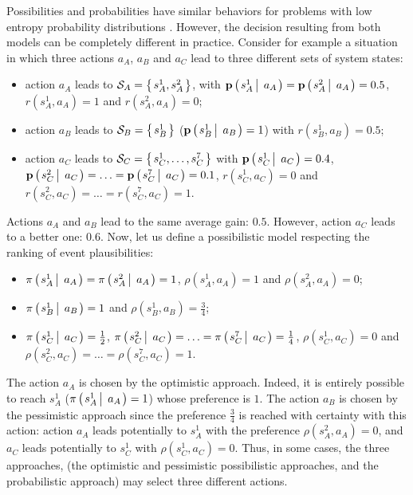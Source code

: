 Possibilities and probabilities have similar behaviors for problems with low
entropy probability distributions \cite{Dubois04probability-possibilitytransformations}.
However, the decision resulting from both models 
can be completely different in practice.
Consider for example a situation in which
three actions $a_A$, $a_B$ and $a_C$ 
lead to three different sets of system states:
\begin{itemize}
\item action $a_A$ leads to $\mathcal{S}_A = \left\{ \left. s_A^1,s_A^2 \right. \right\}$, with
$\textbf{p} \left( \left.  s_A^1 \, \right| \left. \, a_A  \right. \right) = \textbf{p} \left( \left.  s_A^2 \, \right| \left. \, a_A  \right. \right) = 0.5$,
$r(s_A^1,a_A) = 1$ and $r(s_A^2,a_A) = 0$;
\item action $a_B$ leads to $\mathcal{S}_B = \left\{ \left. s_B^1 \right. \right\}$ 
($\textbf{p} \left( \left.  s_B^1 \, \right| \left. \, a_B  \right. \right) = 1$)
with $r(s_B^1,a_B) = 0.5$;
\item action $a_C$ leads to $\mathcal{S}_C = \left\{ \left. s_C^1,\ldots,s_C^7  \right. \right\}$
with $\textbf{p} \left( \left.  s_C^1 \, \right| \left. \, a_C  \right. \right)=0.4$,
$\textbf{p} \left( \left.  s_C^2 \, \right| \left. \, a_C  \right. \right)
= \ldots
= \textbf{p} \left( \left.  s_C^7 \, \right| \left. \, a_C  \right. \right) = 0.1$,
$r(s_C^1,a_C) = 0$ 
and $r(s_C^2,a_C)=\ldots=r(s_C^7,a_C) = 1$.
\end{itemize}
Actions $a_A$ and $a_B$ lead to the same average gain: $0.5$.
However, action $a_C$ leads to a better one: $0.6$.
Now, let us define a possibilistic model respecting the ranking of event plausibilities: 
\begin{itemize}
\item $\pi \left( \left.  s_A^1 \, \right| \left. \, a_A  \right. \right) = \pi \left( \left.  s_A^2 \, \right| \left. \, a_A  \right. \right) = 1$,
$\rho(s_A^1,a_A) = 1$ and $\rho(s_A^2,a_A) = 0$;
\item $\pi \left( \left.  s_B^1 \, \right| \left. \, a_B  \right. \right) = 1$ and $\rho(s_B^1,a_B) = \frac{3}{4}$;
\item $\pi \left( \left.  s_C^1 \, \right| \left. \, a_C  \right. \right)=\frac{1}{2}$,
$\pi \left( \left.  s_C^2 \, \right| \left. \, a_C  \right. \right)
= \ldots
= \pi \left( \left.  s_C^7 \, \right| \left. \, a_C  \right. \right) = \frac{1}{4}$,
$\rho(s_C^1,a_C) = 0$ 
and $\rho(s_C^2,a_C)=\ldots=\rho(s_C^7,a_C) = 1$.
\end{itemize}
The action $a_A$ is chosen by the optimistic approach.
Indeed, it is entirely possible to reach $s_A^1$
($\pi \left( \left.  s_A^1 \, \right| \left. \, a_A  \right. \right) = 1$)
whose preference is $1$.
The action $a_B$ is chosen by the pessimistic approach
since the preference $\frac{3}{4}$ is reached with certainty
with this action:
action $a_A$ leads potentially to $s_A^1$ with the preference 
$\rho(s_A^2,a_A)=0$, and $a_C$ leads potentially to $s_C^1$
with $\rho(s_C^1,a_C) = 0$.
Thus, in some cases, 
the three approaches, (the optimistic and pessimistic possibilistic approaches, 
and the probabilistic approach) 
may select three different actions.

